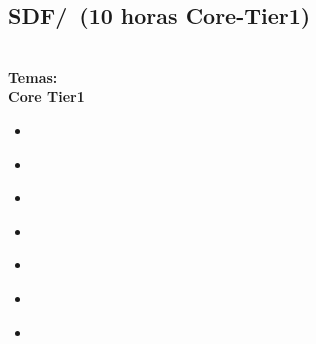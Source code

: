 \subsection{SDF/\SDFFundamentalProgrammingConcepts~(10 horas Core-Tier1)}\label{sec:BOK:SDFFundamentalProgrammingConcepts}
\SDFFundamentalProgrammingConceptsDescription\\
\noindent \textbf{Temas:}\\
\noindent \textbf{Core Tier1}
\begin{itemize}
	\item \SDFFundamentalProgrammingConceptsTopicBasic\label{sec:BOK:SDFFundamentalProgrammingConceptsTopicBasic}
	\item \SDFFundamentalProgrammingConceptsTopicVariables\label{sec:BOK:SDFFundamentalProgrammingConceptsTopicVariables}
	\item \SDFFundamentalProgrammingConceptsTopicExpressions\label{sec:BOK:SDFFundamentalProgrammingConceptsTopicExpressions}
	\item \SDFFundamentalProgrammingConceptsTopicSimple\label{sec:BOK:SDFFundamentalProgrammingConceptsTopicSimple}
	\item \SDFFundamentalProgrammingConceptsTopicConditional\label{sec:BOK:SDFFundamentalProgrammingConceptsTopicConditional}
	\item \SDFFundamentalProgrammingConceptsTopicFunctions\label{sec:BOK:SDFFundamentalProgrammingConceptsTopicFunctions}
	\item \SDFFundamentalProgrammingConceptsTopicThe\label{sec:BOK:SDFFundamentalProgrammingConceptsTopicThe}
\end{itemize}


